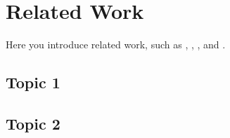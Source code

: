 \chapter{Related Work}

Here you introduce related work, such as \cite{Dingsoyr2014-xt}, \cite{Github_undated-kr}, \cite{Hevner2010-yw}, and \cite{Webster2002-pw}.

\section{Topic 1}


\section{Topic 2}